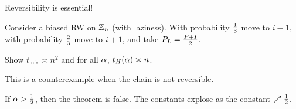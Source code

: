 \begin{rem}
Reversibility is essential!
\end{rem}
\begin{exr}
Consider a biased RW on $\mathbb{Z}_n$ (with laziness). With probability $\frac{1}{3}$ move to $i-1$, with probability $\frac{2}{3}$ move to $i+1$, and take $P_L = \frac{P+I}{2}$. 

Show $t_{\text{mix}}\asymp n^2$ and for all $\alpha$, $t_H(\alpha)\asymp n$. 

This is a counterexample when the chain is not reversible.
\end{exr}
\begin{rem}
If $\alpha>\frac{1}{2}$, then the theorem is false. The constants explose as the constant $\nearrow \frac{1}{2}$.
\end{rem}

